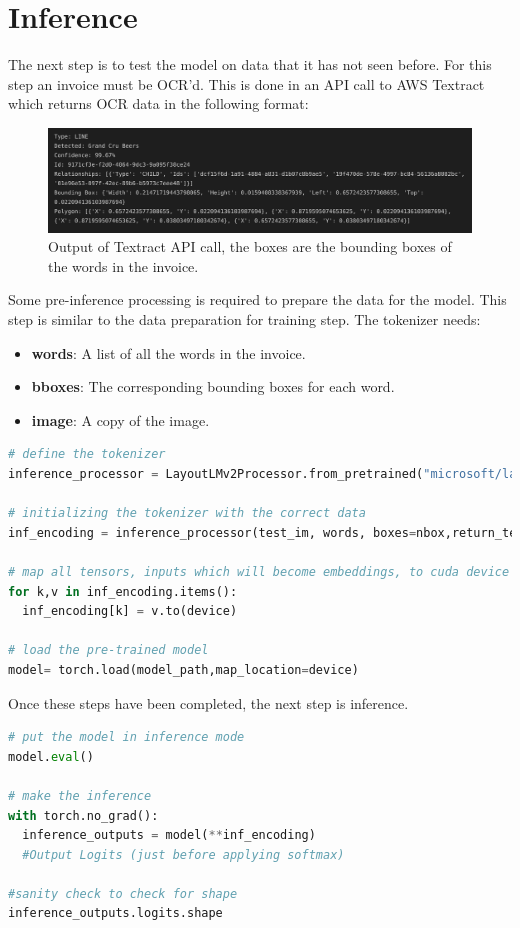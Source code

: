 \section{Inference}
The next step is to test the model on data that it has not seen before. For this step an invoice must be OCR'd.
This is done in an API call to AWS Textract which returns OCR data in the following format:
\begin{figure}[H]
	\centering
	\includegraphics[width=1\textwidth]{figures/textract_output.png}
	\caption{Output of Textract API call, the boxes are the bounding boxes of the words in the invoice.}
	\label{fig:textract_output}
\end{figure}
Some pre-inference processing is required to prepare the data for the model. This step is similar to the data preparation
for training step. The tokenizer needs:
\begin{itemize}
	\item \textbf{words}: A list of all the words in the invoice.
	\item \textbf{bboxes}: The corresponding bounding boxes for each word.
	\item \textbf{image}: A copy of the image.
\end{itemize}
\newpage
\begin{lstlisting}[language=python, caption={Perperation for inference.}, label=prep_for_inference]
# define the tokenizer
inference_processor = LayoutLMv2Processor.from_pretrained("microsoft/layoutlmv2-base-uncased", revision="no_ocr")

# initializing the tokenizer with the correct data
inf_encoding = inference_processor(test_im, words, boxes=nbox,return_tensors="pt", padding="max_length", truncation=True) 

# map all tensors, inputs which will become embeddings, to cuda device
for k,v in inf_encoding.items():
  inf_encoding[k] = v.to(device)

# load the pre-trained model
model= torch.load(model_path,map_location=device)
\end{lstlisting}
Once these steps have been completed, the next step is inference.
\begin{lstlisting}[language=python, caption={Inference.}, label=inference]
# put the model in inference mode
model.eval()

# make the inference
with torch.no_grad():
  inference_outputs = model(**inf_encoding)
  #Output Logits (just before applying softmax)

#sanity check to check for shape
inference_outputs.logits.shape
\end{lstlisting}
